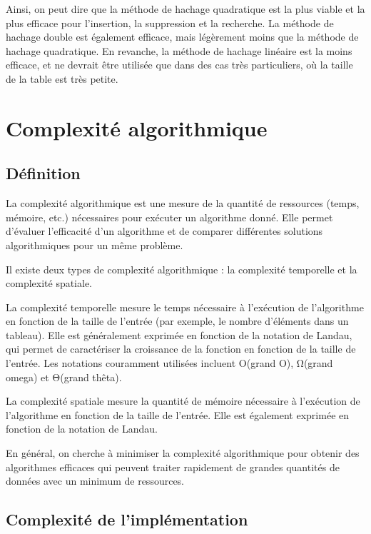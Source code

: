 \documentclass{article}
\begin{document}
    Ainsi, on peut dire que la méthode de hachage quadratique est la plus viable et la plus efficace pour l'insertion, la suppression et la recherche.
    La méthode de hachage double est également efficace, mais légèrement moins que la méthode de hachage quadratique.
    En revanche, la méthode de hachage linéaire est la moins efficace, et ne devrait être utilisée que dans des cas très particuliers, où la taille de la table est très petite.

    \newpage
    \section{Complexité algorithmique}\label{sec:complexite}
    \subsection{Définition}\label{subsec:def}
    La complexité algorithmique est une mesure de la quantité de ressources (temps, mémoire, etc.) nécessaires pour exécuter un algorithme donné.
    Elle permet d'évaluer l'efficacité d'un algorithme et de comparer différentes solutions algorithmiques pour un même problème.

    Il existe deux types de complexité algorithmique : la complexité temporelle et la complexité spatiale.

    La complexité temporelle mesure le temps nécessaire à l'exécution de l'algorithme en fonction de la taille de l'entrée (par exemple, le nombre d'éléments dans un tableau).
    Elle est généralement exprimée en fonction de la notation de Landau, qui permet de caractériser la croissance de la fonction en fonction de la taille de l'entrée.
    Les notations couramment utilisées incluent O(grand O), Ω(grand omega) et Θ(grand thêta).

    La complexité spatiale mesure la quantité de mémoire nécessaire à l'exécution de l'algorithme en fonction de la taille de l'entrée.
    Elle est également exprimée en fonction de la notation de Landau.

    En général, on cherche à minimiser la complexité algorithmique pour obtenir des algorithmes efficaces qui peuvent traiter rapidement de grandes quantités de données avec un minimum de ressources.

    \subsection{Complexité de l'implémentation}\label{subsec:complexite}
\end{document}
